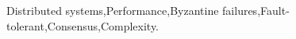 
\begin{keyword}
Distributed systems\sep Performance\sep Byzantine
failures\sep Fault-tolerant\sep Consensus\sep Complexity.
\end{keyword}

\maketitle
